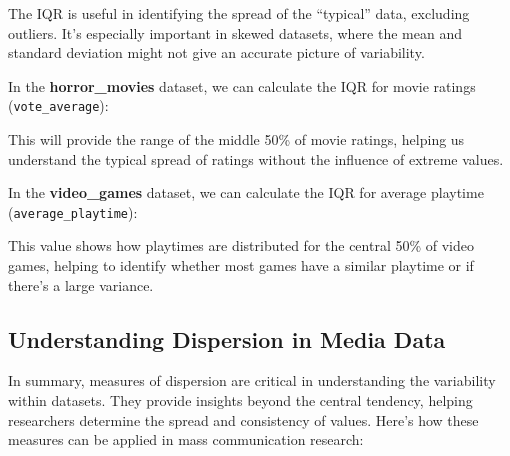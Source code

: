 \documentclass[
]{book}
\newenvironment{Shaded}{\begin{snugshade}}{\end{snugshade}}
\newcommand{\AttributeTok}[1]{\textcolor[rgb]{0.13,0.29,0.53}{#1}}
\newcommand{\CommentTok}[1]{\textcolor[rgb]{0.56,0.35,0.01}{\textit{#1}}}
\newcommand{\ConstantTok}[1]{\textcolor[rgb]{0.56,0.35,0.01}{#1}}
\newcommand{\FunctionTok}[1]{\textcolor[rgb]{0.13,0.29,0.53}{\textbf{#1}}}
\newcommand{\NormalTok}[1]{#1}
\newcommand{\OtherTok}[1]{\textcolor[rgb]{0.56,0.35,0.01}{#1}}
\newcommand{\SpecialCharTok}[1]{\textcolor[rgb]{0.81,0.36,0.00}{\textbf{#1}}}
\begin{document}
The IQR is useful in identifying the spread of the ``typical'' data, excluding outliers. It's especially important in skewed datasets, where the mean and standard deviation might not give an accurate picture of variability.

In the \textbf{horror\_movies} dataset, we can calculate the IQR for movie ratings (\texttt{vote\_average}):

\begin{Shaded}
\end{Shaded}

This will provide the range of the middle 50\% of movie ratings, helping us understand the typical spread of ratings without the influence of extreme values.

In the \textbf{video\_games} dataset, we can calculate the IQR for average playtime (\texttt{average\_playtime}):

\begin{Shaded}
\end{Shaded}

This value shows how playtimes are distributed for the central 50\% of video games, helping to identify whether most games have a similar playtime or if there's a large variance.

\subsection*{Understanding Dispersion in Media Data}\label{understanding-dispersion-in-media-data}

In summary, measures of dispersion are critical in understanding the variability within datasets. They provide insights beyond the central tendency, helping researchers determine the spread and consistency of values. Here's how these measures can be applied in mass communication research:
\end{document}
